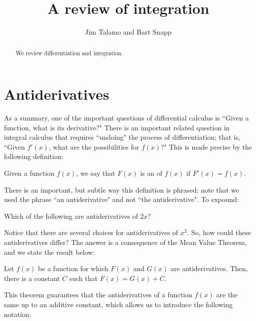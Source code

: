 \documentclass[nooutcomes]{ximera}
\author{Jim Talamo and Bart Snapp}
\title[Dig-In:]{A review of integration}
\begin{document}
\begin{abstract}
  We review differentiation and integration.
\end{abstract}
\maketitle

\section{Antiderivatives}

As a summary, one of the important questions of differential calculus is ``Given a function, what is its derivative?"  There is an important related question in integral calculus that requires ``undoing" the process of differentiation; that is, ``Given $f'(x)$, what are the possibilities for $f(x)$?"   This is made precise by the following definition:

\begin{definition}  
Given a function $f(x)$, we say that $F(x)$ is an  of $f(x)$ if $F'(x) = f(x)$.
\end{definition}

 There is an important, but subtle way this definition is phrased; note that we used the phrase ``an antiderivative" and not ``the antiderivative".  To expound:
 
 \begin{question}
  Which of the following are antiderivatives of $2x$?
  \begin{selectAll}
  \end{selectAll}
\end{question}

Notice that there are several choices for antiderivatives of $x^2$.  So, how could these antiderivatives differ?  The answer is a consequence of the Mean Value Theorem, and we state the result below:

\begin{theorem}
Let $f(x)$ be a function for which $F(x)$ and $G(x)$ are antiderivatives.  Then, there is a constant $C$ such that $F(x) = G(x) +C$. 
\end{theorem}

This theorem guarantees that the antiderivatives of a function $f(x)$ are the same up to an additive constant, which allows us to introduce the following notation:
\end{document}

